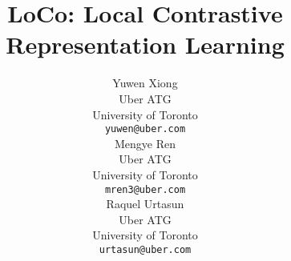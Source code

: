 \documentclass{article}
\title{LoCo: Local Contrastive Representation Learning}
\author{
Yuwen Xiong\\
Uber ATG\\
University of Toronto\\
\texttt{yuwen@uber.com} \\
\And
Mengye Ren\\
Uber ATG\\
University of Toronto\\
\texttt{mren3@uber.com} \\
\And 
Raquel Urtasun\\
Uber ATG\\
University of Toronto\\
\texttt{urtasun@uber.com}
}
\begin{document}
\maketitle











{


}

\end{document}
